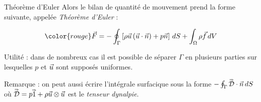 \begin{frame}{Théorème d'Euler}
Alors le bilan de quantité de mouvement prend la forme suivante, appelée {\em Théorème d'Euler} :

\begin{equation}
	\color{rouge}
	\myvec{F} 
	=   
  - \oint_{\Gamma} \left[ \rho \myvec{u} \left ( \myvec{u} \cdot \myvec{n} \right) + p \myvec{n} \right] \, dS
   + \int_\Omega \rho \myvec{f} \, dV
\end{equation}

\pause

Utilité : dans de nombreux cas il est possible de séparer $\Gamma$ en plusieurs parties sur lesquelles $p$ et $\vec{u}$ sont supposés uniformes.

Remarque :
on peut aussi écrire l'intégrale surfacique sous la forme
$- \oint_{\Gamma} \accentset{\Rightarrow}{\cal D} \cdot \vec{n}  \, dS$ où $\accentset{\Rightarrow}{\cal D}  = p \accentset{\Rightarrow}{1} + \rho \vec{u} \otimes \vec{u} $ est le {\em tenseur dynalpie}.




\vspace{0mm}

\end{frame}

